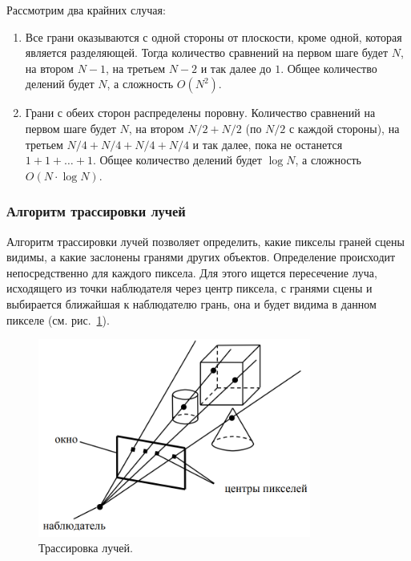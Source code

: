 Рассмотрим два крайних случая:
\begin{enumerate}
    \item Все грани оказываются с одной стороны от плоскости, кроме одной, которая является разделяющей. Тогда количество сравнений на первом шаге будет $N$, на втором $N-1$, на третьем $N-2$ и так далее до $1$. Общее количество делений будет $N$, а сложность $O(N^2)$.
    \item Грани с обеих сторон распределены поровну. Количество сравнений на первом шаге будет $N$, на втором $N/2 + N/2$ (по $N/2$ с каждой стороны), на третьем $N/4 + N/4 + N/4 + N/4$ и так далее, пока не останется $1 + 1 + \ldots + 1$. Общее количество делений будет $\log N$, а сложность $O(N \cdot \log N)$.~\cite{polski}
\end{enumerate} 


\subsubsection{Алгоритм трассировки лучей}

\hspace{1.25cm}
Алгоритм трассировки лучей позволяет определить, какие пикселы граней сцены видимы, а какие заслонены гранями других объектов. Определение происходит непосредственно для каждого пиксела. Для этого ищется пересечение луча, исходящего из точки наблюдателя через центр пиксела, с гранями сцены и выбирается ближайшая к наблюдателю грань, она и будет видима в данном пикселе (см. рис.~\ref{fig:ray_tracing_algorithm_1}).

\begin{figure}[H]
    \centering
    \includegraphics[width=0.8\textwidth]{img/ray_tracing_algorithm_1.png}
    \caption{Трассировка лучей.}
    \label{fig:ray_tracing_algorithm_1}
\end{figure}

